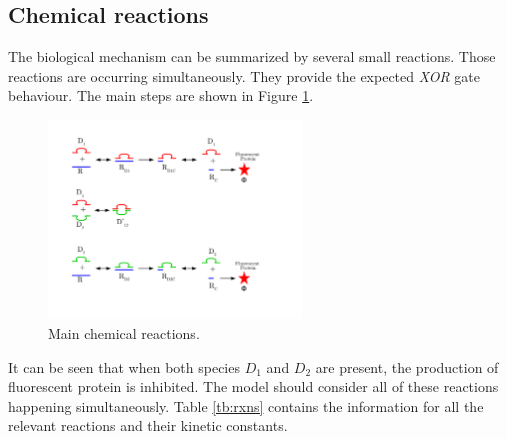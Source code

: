 \documentclass[10pt]{article}
\begin{document}
\subsection{Chemical reactions}
The biological mechanism can be summarized by several small reactions. Those  reactions are occurring simultaneously. They provide the expected \textit{XOR} gate behaviour. The main steps are shown in Figure \ref{fig:steps}.
\begin{figure}[h]
	\centering
	\includegraphics[width=0.6\textwidth]{ReactionSchematic.pdf} 
	\caption{Main chemical reactions.}\label{fig:steps}
\end{figure}\par 
It can be seen that when both species $D_1$ and $D_2$ are present, the production of fluorescent protein is inhibited. The model should consider all of these reactions happening simultaneously. Table \ref{tb:rxns} contains the information for all the relevant reactions and their kinetic constants.
\end{document}
